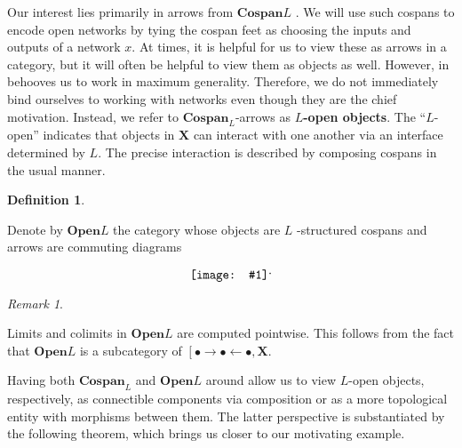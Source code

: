 \documentclass{amsart}
\newcommand{\X}{\cat{X}}
\newcommand{\defn}[1]{\textbf{#1}}
\newcommand{\cat}[1]{\mathbf{#1}}
\newcommand{\diagram}[1]{\raisebox{-0.5\height}{\texttt{[image: \#1]}}}
\newcommand{\Cospan}{\mathbf{Cospan}}
\newcommand{\OpenOb}{\mathbf{Open} }
\newenvironment{exposition}[1]{}{}
\theoremstyle{remark}
\newtheorem{remark}[theorem]{Remark}
\theoremstyle{definition}
\newtheorem{definition}[theorem]{Definition}
\begin{document}
\begin{exposition}{}

  Our interest lies primarily in arrows from \( \Cospan L \) .  We
  will use such cospans to encode open networks by tying the cospan
  feet as choosing the inputs and outputs of a network $ x $. At
  times, it is helpful for us to view these as arrows in a category,
  but it will often be helpful to view them as objects as well.
  However, in behooves us to work in maximum generality. Therefore, we
  do not immediately bind ourselves to working with networks even
  though they are the chief motivation.  Instead, we refer to
  $ \Cospan_L $-arrows as \defn{$ L $-open objects}.
  The ``\( L \)-open'' indicates that objects in $ \X $ can
  interact with one another via an interface determined by
  $ L $.  The precise interaction is described by composing
  cospans in the usual manner.

\end{exposition}

\begin{definition}
  \label{df:open-objects}
  
  Denote by $ \OpenOb{ L } $ the category whose objects are \( L \)
  -structured cospans and arrows are commuting diagrams
  \[
    \diagram{diag_openob_openob-arrow}.
  \]
 
        
\end{definition}

\begin{remark}
  \label{thm:open-obj-ptwise-limits}

  Limits and colimits in \( \OpenOb{L} \) are computed pointwise. This
  follows from the fact that \( \OpenOb{L} \) is a subcategory of \(
  \left[ \bullet \to \bullet \gets \bullet , \X \).   
  
\end{remark}


\begin{exposition}{}

  Having both $ \Cospan_L $ and $ \OpenOb{L} $ around
  allow us to view $ L $-open objects, respectively, as
  connectible components via composition or as a more topological
  entity with morphisms between them. The latter perspective is
  substantiated by the following theorem, which brings us closer to
  our motivating example.
  
\end{exposition}
\end{document}
